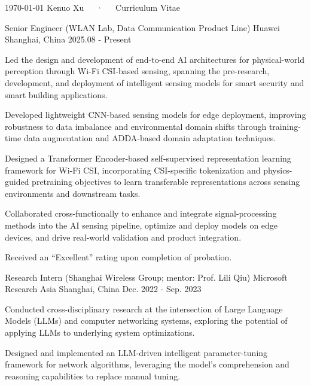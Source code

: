 \documentclass[11pt, a4paper]{awesome-cv}
\begin{document}
\makecvheader

\makecvfooter
  {\today}
  {Kenuo Xu~~~·~~~Curriculum Vitae}
  {\thepage}



\begin{cventries}
	
	\cventry
	{Senior Engineer (WLAN Lab, Data Communication Product Line)} %
	{Huawei} %
	{Shanghai, China} %
	{2025.08 - Present} %
	{
		\begin{cvitems} %
			\item {Led the design and development of end-to-end AI architectures for physical-world perception through Wi-Fi CSI-based sensing, spanning the pre-research, development, and deployment of intelligent sensing models for smart security and smart building applications.}
			\item {Developed lightweight CNN-based sensing models for edge deployment, improving robustness to data imbalance and environmental domain shifts through training-time data augmentation and ADDA-based domain adaptation techniques.}
			\item {Designed a Transformer Encoder-based self-supervised representation learning framework for Wi-Fi CSI, incorporating CSI-specific tokenization and physics-guided pretraining objectives to learn transferable representations across sensing environments and downstream tasks.}
			\item {Collaborated cross-functionally to enhance and integrate signal-processing methods into the AI sensing pipeline, optimize and deploy models on edge devices, and drive real-world validation and product integration.}
			\item {Received an ``Excellent'' rating upon completion of probation.}
	\end{cvitems}
}
	
	\cventry
	{Research Intern (Shanghai Wireless Group; mentor: Prof. Lili Qiu)} %
	{Microsoft Research Asia} %
	{Shanghai, China} %
	{Dec. 2022 - Sep. 2023} %
	{
		\begin{cvitems} %
			\item {Conducted cross-disciplinary research at the intersection of Large Language Models (LLMs) and computer networking systems, exploring the potential of applying LLMs to underlying system optimizations.}
			\item {Designed and implemented an LLM-driven intelligent parameter-tuning framework for network algorithms, leveraging the model's comprehension and reasoning capabilities to replace manual tuning.}
		\end{cvitems}
	}
	

\end{cventries}
\end{document}
